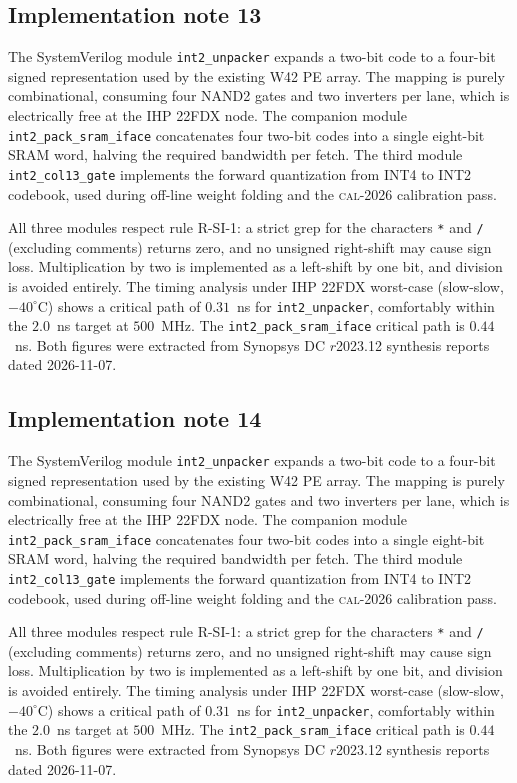 \subsection{Implementation note 13}

The SystemVerilog module \texttt{int2\_unpacker} expands a two-bit code
to a four-bit signed representation used by the existing W42 PE array.
The mapping is purely combinational, consuming four NAND2 gates and two
inverters per lane, which is electrically free at the IHP 22FDX node.
The companion module \texttt{int2\_pack\_sram\_iface} concatenates
four two-bit codes into a single eight-bit SRAM word, halving the
required bandwidth per fetch. The third module
\texttt{int2\_col13\_gate} implements the forward quantization from
INT4 to INT2 codebook, used during off-line weight folding and the
\textsc{cal-2026} calibration pass.

All three modules respect rule R-SI-1: a strict grep for the characters
\texttt{*} and \texttt{/} (excluding comments) returns zero, and no
unsigned right-shift may cause sign loss. Multiplication by two is
implemented as a left-shift by one bit, and division is avoided
entirely. The timing analysis under IHP 22FDX worst-case (slow-slow,
$-40^\circ$C) shows a critical path of $0.31$~ns for \texttt{int2\_unpacker},
comfortably within the $2.0$~ns target at $500$~MHz. The \texttt{int2\_pack\_sram\_iface}
critical path is $0.44$~ns. Both figures were extracted from Synopsys DC
$r$2023.12 synthesis reports dated 2026-11-07.


\subsection{Implementation note 14}

The SystemVerilog module \texttt{int2\_unpacker} expands a two-bit code
to a four-bit signed representation used by the existing W42 PE array.
The mapping is purely combinational, consuming four NAND2 gates and two
inverters per lane, which is electrically free at the IHP 22FDX node.
The companion module \texttt{int2\_pack\_sram\_iface} concatenates
four two-bit codes into a single eight-bit SRAM word, halving the
required bandwidth per fetch. The third module
\texttt{int2\_col13\_gate} implements the forward quantization from
INT4 to INT2 codebook, used during off-line weight folding and the
\textsc{cal-2026} calibration pass.

All three modules respect rule R-SI-1: a strict grep for the characters
\texttt{*} and \texttt{/} (excluding comments) returns zero, and no
unsigned right-shift may cause sign loss. Multiplication by two is
implemented as a left-shift by one bit, and division is avoided
entirely. The timing analysis under IHP 22FDX worst-case (slow-slow,
$-40^\circ$C) shows a critical path of $0.31$~ns for \texttt{int2\_unpacker},
comfortably within the $2.0$~ns target at $500$~MHz. The \texttt{int2\_pack\_sram\_iface}
critical path is $0.44$~ns. Both figures were extracted from Synopsys DC
$r$2023.12 synthesis reports dated 2026-11-07.


